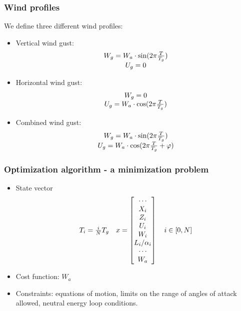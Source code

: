 \documentclass[compress]{beamer}
\begin{document}
\begin{frame}
  \frametitle{Wind profiles}
  We define three different wind profiles:
  \begin{itemize}
    \item Vertical wind gust:
      \begin{equation*}
	\begin{array}[c]{c}
	  W_g = W_a \cdot \sin(2\pi \frac{T}{T_g}) \\
	  U_g = 0 
	\end{array}
      \end{equation*}
    \item Horizontal wind gust:
      \begin{equation*}
	\begin{array}[c]{c}
	  W_g =0 \\ 
	  U_g = W_a \cdot \cos(2\pi \frac{T}{T_g}) 
	\end{array}
      \end{equation*}
    \item Combined wind gust:
      \begin{equation*}
	\begin{array}[c]{c}
	  W_g = W_a \cdot \sin(2\pi \frac{T}{T_g}) \\ 
	  U_g = W_a \cdot \cos(2 \pi \frac{T}{T_g} + \varphi)
	\end{array}
      \end{equation*}
  \end{itemize}
\end{frame}

\begin{frame}
  \frametitle{Optimization algorithm - a minimization problem}
  \begin{itemize}
    \item State vector
      \begin{equation*}
	\begin{array}[c]{cc}
	  T_i=\frac{i}{N}T_g &
	  x= 
	  \begin{bmatrix}
	    \cdots \\
	    X_i \\
	    Z_i \\
	    U_i \\
	    W_i \\
	    L_i / \alpha_i \\
	    \cdots \\
	    W_a
	  \end{bmatrix}
	  \quad i \in [0,N]
	\end{array}
      \end{equation*}
    \item Cost function: $W_a$
    \item Constraints: equations of motion, limits on the range of angles of attack allowed, neutral energy loop conditions.
  \end{itemize}
\end{frame}
\end{document}
